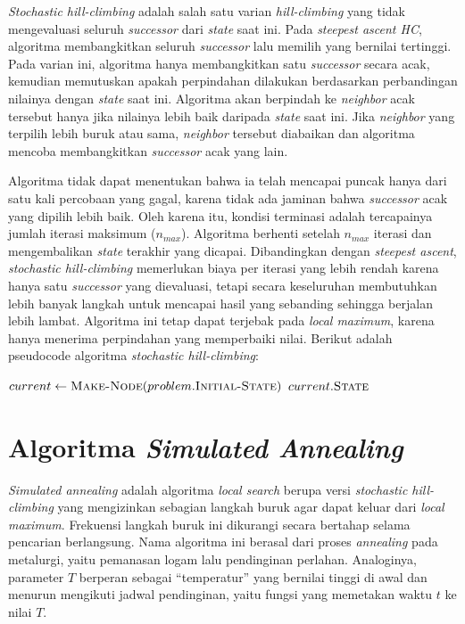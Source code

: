 \textit{Stochastic hill-climbing} adalah salah satu varian \textit{hill-climbing} yang tidak mengevaluasi seluruh \textit{successor} dari \textit{state} saat ini. Pada \textit{steepest ascent HC}, algoritma membangkitkan seluruh \textit{successor} lalu memilih yang bernilai tertinggi. Pada varian ini, algoritma hanya membangkitkan satu \textit{successor} secara acak, kemudian memutuskan apakah perpindahan dilakukan berdasarkan perbandingan nilainya dengan \textit{state} saat ini. Algoritma akan berpindah ke \textit{neighbor} acak tersebut hanya jika nilainya lebih baik daripada \textit{state} saat ini. Jika \textit{neighbor} yang terpilih lebih buruk atau sama, \textit{neighbor} tersebut diabaikan dan algoritma mencoba membangkitkan \textit{successor} acak yang lain.

Algoritma tidak dapat menentukan bahwa ia telah mencapai puncak hanya dari satu kali percobaan yang gagal, karena tidak ada jaminan bahwa \textit{successor} acak yang dipilih lebih baik. Oleh karena itu, kondisi terminasi adalah tercapainya jumlah iterasi maksimum ($n_{max}$). Algoritma berhenti setelah $n_{max}$ iterasi dan mengembalikan \textit{state} terakhir yang dicapai. Dibandingkan dengan \textit{steepest ascent}, \textit{stochastic hill-climbing} memerlukan biaya per iterasi yang lebih rendah karena hanya satu \textit{successor} yang dievaluasi, tetapi secara keseluruhan membutuhkan lebih banyak langkah untuk mencapai hasil yang sebanding sehingga berjalan lebih lambat. Algoritma ini tetap dapat terjebak pada \textit{local maximum}, karena hanya menerima perpindahan yang memperbaiki nilai. Berikut adalah pseudocode algoritma \textit{stochastic hill-climbing}:

\begin{algorithm}[H]
\caption{Stochastic Hill-Climbing}
\label{alg:stochastic-hill-climbing}
$current \gets \textsc{Make-Node}(problem.\textsc{Initial-State})$\;
\KwRet $current.\textsc{State}$\;
\end{algorithm}

\section{Algoritma \textit{Simulated Annealing}}

\textit{Simulated annealing} adalah algoritma \textit{local search} berupa versi \textit{stochastic hill-climbing} yang mengizinkan sebagian langkah buruk agar dapat keluar dari \textit{local maximum}. Frekuensi langkah buruk ini dikurangi secara bertahap selama pencarian berlangsung. Nama algoritma ini berasal dari proses \textit{annealing} pada metalurgi, yaitu pemanasan logam lalu pendinginan perlahan. Analoginya, parameter $T$ berperan sebagai ``temperatur'' yang bernilai tinggi di awal dan menurun mengikuti jadwal pendinginan, yaitu fungsi yang memetakan waktu $t$ ke nilai $T$.

